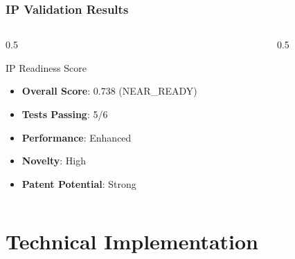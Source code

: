 \documentclass{beamer}
\begin{document}
\begin{frame}
\frametitle{IP Validation Results}
\begin{columns}
\begin{column}{0.5\textwidth}
\begin{block}{IP Readiness Score}
\begin{itemize}
\item \textbf{Overall Score}: 0.738 (NEAR\_READY)
\item \textbf{Tests Passing}: 5/6
\item \textbf{Performance}: Enhanced
\item \textbf{Novelty}: High
\item \textbf{Patent Potential}: Strong
\end{itemize}
\end{block}
\end{column}
\begin{column}{0.5\textwidth}
\begin{center}
\end{center}
\end{column}
\end{columns}
\end{frame}

\section{Technical Implementation}
\end{document}
